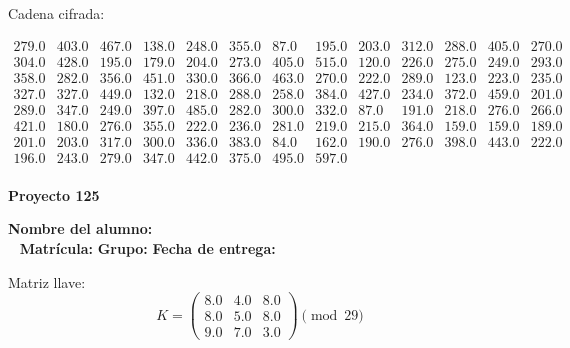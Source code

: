 \documentclass[12pt]{article}
\begin{document}
Cadena cifrada:
\begin{center}
$\begin{array}{lllllllllllll}
279.0 & 403.0 & 467.0 & 138.0 & 248.0 & 355.0 & 87.0 & 195.0 & 203.0 & 312.0 & 288.0 & 405.0 & 270.0\\
304.0 & 428.0 & 195.0 & 179.0 & 204.0 & 273.0 & 405.0 & 515.0 & 120.0 & 226.0 & 275.0 & 249.0 & 293.0\\
358.0 & 282.0 & 356.0 & 451.0 & 330.0 & 366.0 & 463.0 & 270.0 & 222.0 & 289.0 & 123.0 & 223.0 & 235.0\\
327.0 & 327.0 & 449.0 & 132.0 & 218.0 & 288.0 & 258.0 & 384.0 & 427.0 & 234.0 & 372.0 & 459.0 & 201.0\\
289.0 & 347.0 & 249.0 & 397.0 & 485.0 & 282.0 & 300.0 & 332.0 & 87.0 & 191.0 & 218.0 & 276.0 & 266.0\\
421.0 & 180.0 & 276.0 & 355.0 & 222.0 & 236.0 & 281.0 & 219.0 & 215.0 & 364.0 & 159.0 & 159.0 & 189.0\\
201.0 & 203.0 & 317.0 & 300.0 & 336.0 & 383.0 & 84.0 & 162.0 & 190.0 & 276.0 & 398.0 & 443.0 & 222.0\\
196.0 & 243.0 & 279.0 & 347.0 & 442.0 & 375.0 & 495.0 & 597.0\\
\end{array}$
\end{center}

\newpage


\textbf{Proyecto 125}

\textbf{Nombre del alumno:} \underline{\hspace{13cm}}\\\
\vspace{1cm}
\textbf{Matrícula:} \underline{\hspace{4cm}} \hspace{1cm}
\textbf{Grupo:} \underline{\hspace{2cm}}
\textbf{Fecha de entrega:} \underline{\hspace{2cm}}

\medskip

Matriz llave:
\[
K = \begin{pmatrix}
8.0 & 4.0 & 8.0\\
8.0 & 5.0 & 8.0\\
9.0 & 7.0 & 3.0
\end{pmatrix} \pmod{29}
\]
\end{document}
